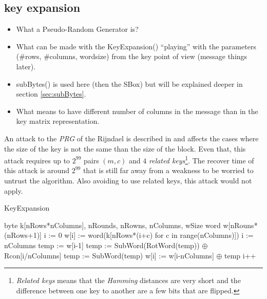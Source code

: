 \documentclass[10pt,a4paper,twoside]{llncs}
\begin{document}
\subsection{key expansion}\label{sec:keyExpansion}
\begin{itemize}
 \item What a Pseudo-Random Generator is?
\end{itemize}
\begin{itemize}
 \item What can be made with the KeyExpansion() ``playing'' with the parameters (\#rows, \#columns, wordsize) from the key point of view (message things later).
 \item subBytes() is used here (then the SBox) but will be explained deeper in section \ref{sec:subBytes}.
 \item What means to have different number of columns in the message than in the key matrix representation.
\end{itemize}

An attack to the \emph{PRG} of the Rijndael is described in \cite{fullaes-192-256} and affects the cases where the size of the key is not the same than the size of the block. Even that, this attack requires up to $2^{99}$ pairs $(m,c)$ and $4$ \emph{related keys}\footnote{\emph{Related keys} means that the \emph{Hamming} distances are very short and the difference between one key to another are a few bits that are flipped.}. The recover time of this attack is around $2^{99}$ that is still far away from a weakness to be worried to untrust the algorithm. Also avoiding to use related keys, this attack would not apply.

\begin{algorithm}
 \caption{KeyExpansion}
 \label{alg:keyExpansion}
 \begin{algorithmic}[1]
  \REQUIRE byte k[nRows*nColumns], nRounds, nRowns, nColumns, wSize
  \ENSURE word w[nRouns*(nRows+1)]
  \STATE i := 0
    \STATE w[i] := word(k[nRows*(i+c) for c in range(nColumns)])
  \ENDWHILE
  \STATE i := nColumns
    \STATE temp := w[i-1]
      \STATE temp := SubWord(RotWord(temp)) $\oplus$ Rcon[i/nColumns]
    \ELSE
      \STATE temp := SubWord(temp)
    \ENDIF
    \STATE w[i] := w[i-nColumns] $\oplus$ temp
    \STATE i++
  \ENDWHILE
 \end{algorithmic}
\end{algorithm}
\end{document}
